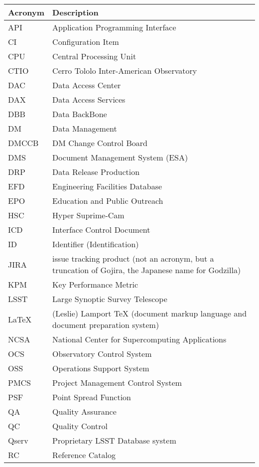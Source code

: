 \addtocounter{table}{-1}
\begin{longtable}{|l|p{}|}\hline 
\textbf{Acronym} & \textbf{Description}  \\\hline
API&Application Programming Interface \\\hline
CI&Configuration Item \\\hline
CPU&Central Processing Unit \\\hline
CTIO&Cerro Tololo Inter-American Observatory \\\hline
DAC&Data Access Center \\\hline
DAX&Data Access Services \\\hline
DBB&Data BackBone \\\hline
DM&Data Management \\\hline
DMCCB&DM Change Control Board \\\hline
DMS&Document Management System (ESA) \\\hline
DRP&Data Release Production \\\hline
EFD&Engineering Facilities Database \\\hline
EPO&Education and Public Outreach \\\hline
HSC&Hyper Suprime-Cam \\\hline
ICD&Interface Control Document \\\hline
ID&Identifier (Identification) \\\hline
JIRA&issue tracking product (not an acronym, but a truncation of Gojira, the Japanese name for Godzilla) \\\hline
KPM&Key Performance Metric \\\hline
LSST&Large Synoptic Survey Telescope \\\hline
LaTeX&(Leslie) Lamport TeX (document markup language and document preparation system) \\\hline
NCSA&National Center for Supercomputing Applications \\\hline
OCS&Observatory Control System \\\hline
OSS&Operations Support System \\\hline
PMCS&Project Management Control System \\\hline
PSF&Point Spread Function \\\hline
QA&Quality Assurance \\\hline
QC&Quality Control \\\hline
Qserv&Proprietary LSST Database system \\\hline
RC&Reference Catalog \\\hline

\end{longtable}
